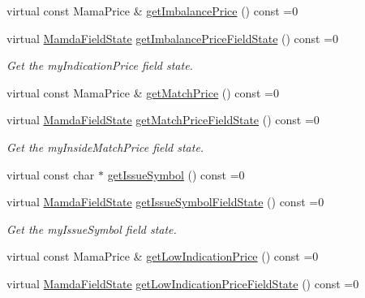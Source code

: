 \begin{CompactItemize}
virtual const Mama\-Price \& \hyperlink{classWombat_1_1MamdaOrderImbalanceUpdate_9ac691e50c0a93178578d1225c88f784}{get\-Imbalance\-Price} () const =0
\item 
virtual \hyperlink{namespaceWombat_93aac974f2ab713554fd12a1fa3b7d2a}{Mamda\-Field\-State} \hyperlink{classWombat_1_1MamdaOrderImbalanceUpdate_1d0439aaec9d8c23fdde521728658293}{get\-Imbalance\-Price\-Field\-State} () const =0
\begin{CompactList}\small\item\em Get the my\-Indication\-Price field state. \item\end{CompactList}\item 
virtual const Mama\-Price \& \hyperlink{classWombat_1_1MamdaOrderImbalanceUpdate_bb0c49b821a422064cb5a82fe5dc67af}{get\-Match\-Price} () const =0
\item 
virtual \hyperlink{namespaceWombat_93aac974f2ab713554fd12a1fa3b7d2a}{Mamda\-Field\-State} \hyperlink{classWombat_1_1MamdaOrderImbalanceUpdate_63f201f6bf8fbd1d7f08da20d75031be}{get\-Match\-Price\-Field\-State} () const =0
\begin{CompactList}\small\item\em Get the my\-Inside\-Match\-Price field state. \item\end{CompactList}\item 
virtual const char $\ast$ \hyperlink{classWombat_1_1MamdaOrderImbalanceUpdate_20fd3192f5d79eae73cf0f4d871cdac2}{get\-Issue\-Symbol} () const =0
\item 
virtual \hyperlink{namespaceWombat_93aac974f2ab713554fd12a1fa3b7d2a}{Mamda\-Field\-State} \hyperlink{classWombat_1_1MamdaOrderImbalanceUpdate_da309179e4a15659649e74f270e2a666}{get\-Issue\-Symbol\-Field\-State} () const =0
\begin{CompactList}\small\item\em Get the my\-Issue\-Symbol field state. \item\end{CompactList}\item 
virtual const Mama\-Price \& \hyperlink{classWombat_1_1MamdaOrderImbalanceUpdate_e8ba78184cea2703611b9f16e51c3c05}{get\-Low\-Indication\-Price} () const =0
\item 
virtual \hyperlink{namespaceWombat_93aac974f2ab713554fd12a1fa3b7d2a}{Mamda\-Field\-State} \hyperlink{classWombat_1_1MamdaOrderImbalanceUpdate_e7efb8166108c7026e0b2ade4142421d}{get\-Low\-Indication\-Price\-Field\-State} () const =0

\end{CompactItemize}
